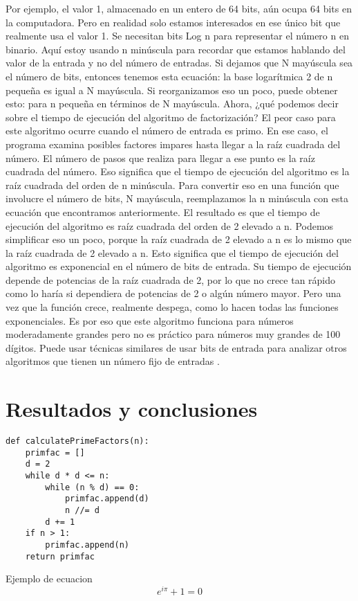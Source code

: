 \documentclass{article}
\begin{document}
Por ejemplo, el valor 1, almacenado en un entero de 64
bits, aún ocupa 64 bits en la computadora. Pero en realidad solo estamos
interesados en ese único bit que realmente usa el valor 1. Se necesitan bits
Log n para representar el número n en binario. Aquí estoy usando n minúscula
para recordar que estamos hablando del valor de la entrada y no del número de
entradas. Si dejamos que N mayúscula sea el número de bits, entonces tenemos
esta ecuación: la base logarítmica 2 de n pequeña es igual a N mayúscula. Si
reorganizamos eso un poco, puede obtener esto: para n pequeña en términos de N
mayúscula. Ahora, ¿qué podemos decir sobre el tiempo de ejecución del algoritmo
de factorización? El peor caso para este algoritmo ocurre cuando el número de
entrada es primo. En ese caso, el programa examina posibles factores impares
hasta llegar a la raíz cuadrada del número. El número de pasos que realiza para
llegar a ese punto es la raíz cuadrada del número. Eso significa que el tiempo
de ejecución del algoritmo es la raíz cuadrada del orden de n minúscula. Para
convertir eso en una función que involucre el número de bits, N mayúscula,
reemplazamos la n minúscula con esta ecuación que encontramos anteriormente. El
resultado es que el tiempo de ejecución del algoritmo es raíz cuadrada del orden
de 2 elevado a n. Podemos simplificar eso un poco, porque la raíz cuadrada de 2
elevado a n es lo mismo que la raíz cuadrada de 2 elevado a n. Esto significa
que el tiempo de ejecución del algoritmo es exponencial en el número de bits de
entrada. Su tiempo de ejecución depende de potencias de la raíz cuadrada de 2,
por lo que no crece tan rápido como lo haría si dependiera de potencias de 2 o
algún número mayor. Pero una vez que la función crece, realmente despega, como
lo hacen todas las funciones exponenciales. Es por eso que este algoritmo
funciona para números moderadamente grandes pero no es práctico para números muy
grandes de 100 dígitos. Puede usar técnicas similares de usar bits de entrada
para analizar otros algoritmos que tienen un número fijo de entradas \cite{stephens2015learning}.

\section{Resultados y conclusiones}

\begin{lstlisting}
def calculatePrimeFactors(n):
    primfac = []
    d = 2
    while d * d <= n:
        while (n % d) == 0:
            primfac.append(d)
            n //= d
        d += 1
    if n > 1:
        primfac.append(n)
    return primfac

\end{lstlisting}
    

 


Ejemplo de ecuacion
$$ e^{i\pi} + 1 = 0 $$
\end{document}
